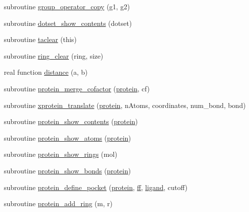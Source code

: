 \begin{DoxyCompactItemize}
\item 
subroutine \hyperlink{classcalc__xscore_a52f65faf32434e66e846fc833d979473}{group\-\_\-operator\-\_\-copy} (g1, g2)
\item 
subroutine \hyperlink{classcalc__xscore_a3c470ecfd45db399bb8f089567b3286d}{dotset\-\_\-show\-\_\-contents} (dotset)
\item 
subroutine \hyperlink{classcalc__xscore_a81a2f67d0c792611c8f9f6b6f4e39ef6}{taclear} (this)
\item 
subroutine \hyperlink{classcalc__xscore_a24c5a0f8b002da1a0a5efe5c79034484}{ring\-\_\-clear} (ring, size)
\item 
real function \hyperlink{classcalc__xscore_a9549d00bc3dbc987d9161e831a433493}{distance} (a, b)
\item 
subroutine \hyperlink{classcalc__xscore_a97b49af827f51159f455c9a90c4f8e35}{protein\-\_\-merge\-\_\-cofactor} (\hyperlink{classcalc__xscore_a98803b585e24ba9794bf16dc263374dc}{protein}, cf)
\item 
subroutine \hyperlink{classcalc__xscore_a175d1b792032d6cf86243348e1a840da}{xprotein\-\_\-translate} (\hyperlink{classcalc__xscore_a98803b585e24ba9794bf16dc263374dc}{protein}, n\-Atoms, coordinates, num\-\_\-bond, bond)
\item 
subroutine \hyperlink{classcalc__xscore_a39d707fb6ec8beb15ea8e651600469ab}{protein\-\_\-show\-\_\-contents} (\hyperlink{classcalc__xscore_a98803b585e24ba9794bf16dc263374dc}{protein})
\item 
subroutine \hyperlink{classcalc__xscore_acd543b702a0add567fbfcb3000a77bee}{protein\-\_\-show\-\_\-atoms} (\hyperlink{classcalc__xscore_a98803b585e24ba9794bf16dc263374dc}{protein})
\item 
subroutine \hyperlink{classcalc__xscore_af6156e6d7fb6e6f4b3fd8daf6e1e1513}{protein\-\_\-show\-\_\-rings} (mol)
\item 
subroutine \hyperlink{classcalc__xscore_a1cfee236265ab3aacb7a6823fb8d7ffd}{protein\-\_\-show\-\_\-bonds} (\hyperlink{classcalc__xscore_a98803b585e24ba9794bf16dc263374dc}{protein})
\item 
subroutine \hyperlink{classcalc__xscore_ae8388e5bcc799443fceb243046278e17}{protein\-\_\-define\-\_\-pocket} (\hyperlink{classcalc__xscore_a98803b585e24ba9794bf16dc263374dc}{protein}, \hyperlink{classcalc__xscore_a95d3b146435fd7fd216201f6119869c0}{ff}, \hyperlink{classcalc__xscore_ad2efc1238a463be4b83681419cd6b113}{ligand}, cutoff)
\item 
subroutine \hyperlink{classcalc__xscore_a27b6856b3ae78b21daf138e89349dc76}{protein\-\_\-add\-\_\-ring} (m, r)

\end{DoxyCompactItemize}
